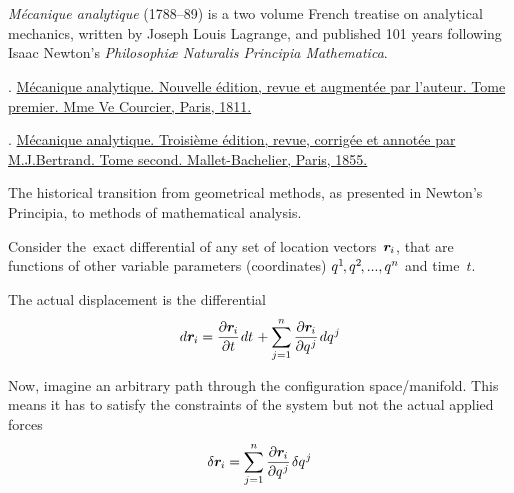 \section{}

\label{section:virtualworkprinciple.classicalmechanics}

\emph{Mécanique analytique} (1788--89) is a two volume French treatise on analytical mechanics, written by Joseph Louis Lagrange, and published 101 years following Isaac Newton’s \emph{Philosophiæ Naturalis Principia Mathematica}.

.
\href{https://play.google.com/books/reader?id=Q8MKAAAAYAAJ&pg=GBS.PP7}{Mécanique analytique. Nouvelle édition, revue et augmentée par l’auteur. Tome premier. Mme Ve Courcier, Paris, 1811.} 

.
\href{https://play.google.com/books/reader?id=TmMSAAAAIAAJ&pg=GBS.PP9}{Mécanique analytique. Troisième édition, revue, corrigée et annotée par M.\:J.\:Bertrand. Tome second. Mallet-Bachelier, Paris, 1855.} 

The historical transition from geometrical methods, as presented in Newton’s Principia, to methods of mathematical analysis.

{\small
\setlength{\abovedisplayskip}{2pt}\setlength{\belowdisplayskip}{2pt}

Consider the~exact differential of any set of location vectors~${\bm{r}_{\hspace{-0.1ex}i}}$, that are functions of other variable parameters (coordinates) ${q^{1} \hspace{-0.25ex}, q^{2} \hspace{-0.25ex}, ..., q^{n}}$ and time~$t$.

The actual displacement is the differential
\[
\displaystyle d\bm{r}_{\hspace{-0.1ex}i} = \frac{\partial \bm{r}_{\hspace{-0.1ex}i}}{\partial t} \hspace{.16ex} dt \hspace{.2ex} + \sum_{j=1}^{n} {\frac{\partial \bm{r}_{\hspace{-0.1ex}i}}{\partial q^{\hspace{.1ex}j}}} \hspace{.2ex} dq^{\hspace{.1ex}j}
\]

Now, imagine an arbitrary path through the configuration space/manifold. This means it has to satisfy the constraints of the system but not the actual applied forces
\[
\delta \bm{r}_{\hspace{-0.1ex}i} = \displaystyle\sum_{j=1}^{n} {\displaystyle\frac {\partial \bm{r}_{\hspace{-0.1ex}i}}{\partial q^{\hspace{.1ex}j}}} \hspace{.2ex} \delta q^{\hspace{.1ex}j}
\]

\par}


